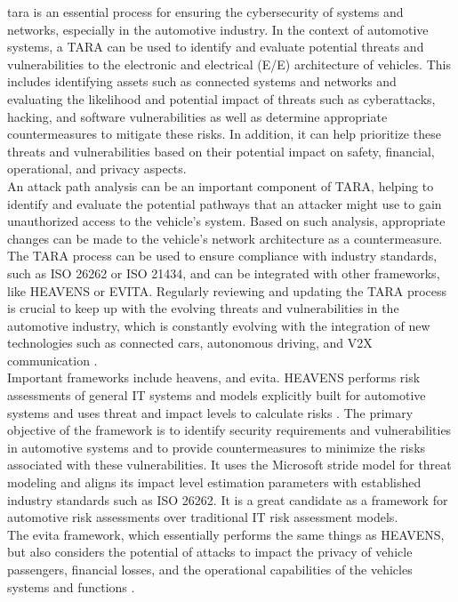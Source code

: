 \gls{tara} is an essential process for ensuring the cybersecurity of systems and networks, especially in the automotive industry. 
In the context of automotive systems, a TARA can be used to identify and evaluate potential threats and vulnerabilities to the electronic and electrical (E/E) architecture of vehicles.
This includes identifying assets such as connected systems and networks and evaluating the likelihood and potential impact of threats such as 
cyberattacks, hacking, and software vulnerabilities as well as determine appropriate countermeasures to mitigate these risks.
In addition, it can help prioritize these threats and vulnerabilities based on their potential impact on safety, financial, operational, and privacy aspects.\\
An attack path analysis can be an important component of TARA, helping to identify and evaluate the potential pathways that an attacker might use to gain unauthorized access to the vehicle's system. 
Based on such analysis, appropriate changes can be made to the vehicle's network architecture as a countermeasure.
The TARA process can be used to ensure compliance with industry standards, such as ISO 26262 or ISO 21434, and can be integrated with other frameworks, like HEAVENS or EVITA. 
Regularly reviewing and updating the TARA process is crucial to keep up with the evolving threats and vulnerabilities in the automotive industry, 
which is constantly evolving with the integration of new technologies such as connected cars, autonomous driving, and V2X communication \cite{tara}.\\

Important frameworks include \gls{heavens}, and \gls{evita}.
HEAVENS performs risk assessments of general IT systems and models explicitly built for automotive systems and uses threat and impact levels to calculate risks \cite{heavens}.
The primary objective of the framework is to identify security requirements and vulnerabilities in automotive systems and to provide countermeasures to minimize the risks associated with these vulnerabilities. 
It uses the Microsoft \acrshort{stride} model for threat modeling and aligns its impact level estimation parameters with established industry standards such as ISO 26262. 
It is a great candidate as a framework for automotive risk assessments over traditional IT risk assessment models.\\
The \gls{evita} framework, which essentially performs the same things as HEAVENS, 
but also considers the potential of attacks to impact the privacy of vehicle passengers, financial losses, and the operational capabilities of the vehicles systems and functions \cite{evita}.\\


